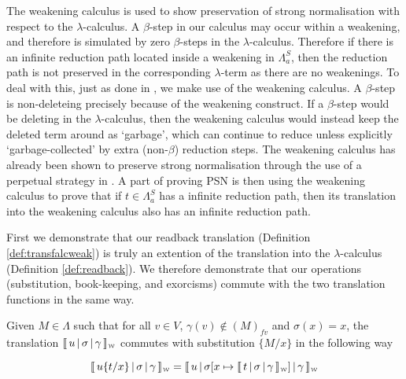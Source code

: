 \documentclass[a4paper,UKenglish,cleveref, autoref]{lipics-v2019}
\newcommand{\FALC}{\Lambda^{S}_{a}}
\newcommand{\fv}[1]{(#1)_{fv}}
\newcommand{\sub}[3]{#1 \{ #2 / #3 \}}
\newcommand{\weaksymbol}{\mbox{\tiny $\mathcal{W}$}}
\newcommand{\readweakwmap}[3]{\llbracket \, #1 \, \vert \, #2 \, \vert \, #3  \, \rrbracket_{\weaksymbol} }
\begin{document}
The weakening calculus is used to show preservation of strong normalisation with respect to the $\lambda$-calculus. A $\beta$-step in our calculus may occur within a weakening, and therefore is simulated by zero $\beta$-steps in the $\lambda$-calculus. Therefore if there is an infinite reduction path located inside a weakening in $\FALC$, then the reduction path is not preserved in the corresponding $\lambda$-term as there are no weakenings. To deal with this, just as done in \cite{kesneraccattoli12, gundersen2013atomic, he2018atomic}, we make use of the weakening calculus. A $\beta$-step is non-deleteing precisely because of the weakening construct. If a $\beta$-step would be deleting in the $\lambda$-calculus, then the weakening calculus would instead keep the deleted term around as `garbage', which can continue to reduce unless explicitly `garbage-collected' by extra (non-$\beta$) reduction steps. The weakening calculus has already been shown to preserve strong normalisation through the use of a perpetual strategy in \cite{gundersen2013atomic}. A part of proving PSN is then using the weakening calculus to prove that if $t \in \FALC$ has a infinite reduction path, then its translation into the weakening calculus also has an infinite reduction path.

First we demonstrate that our readback translation (Definition \ref{def:transfalcweak}) is truly an extention of the translation into the $\lambda$-calculus (Definition \ref{def:readback}). We therefore demonstrate that our operations (substitution, book-keeping, and exorcisms) commute with the two translation functions in the same way.

\begin{proposition}
\label{prop:suboutcomm}
Given $M \in \Lambda$ such that for all $v \in V$, $\gamma(v) \not\in \fv{M}$  and $\sigma(x) = x$, the translation $\readweakwmap{u}{\sigma}{\gamma}$ commutes with substitution $\sub{}{M}{x}$ in the following way

$$\readweakwmap{u \sub{}{t}{x}}{\sigma}{\gamma} = \readweakwmap{u}{\sigma[x \mapsto \readweakwmap{t}{\sigma}{\gamma}]}{\gamma}$$
\end{proposition}
\end{document}
